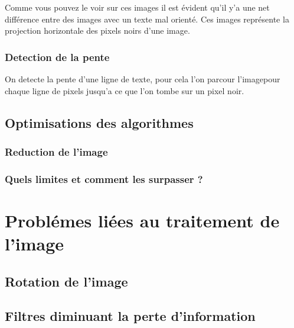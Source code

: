  Comme vous pouvez le voir sur ces images il est \'evident qu'il y'a une
 net diff\'erence entre des images avec un texte mal orient\'e. Ces
 images repr\'esente la projection horizontale des pixels noirs d'une image.





\subsection{ Detection de la pente }
On detecte la pente d'une ligne de texte, pour cela l'on parcour l'imagepour
chaque ligne de pixels jusqu'a ce que l'on tombe sur un pixel noir.

\section{ Optimisations des algorithmes }
\subsection{ Reduction de l'image }


\subsection{ Quels limites et comment les surpasser ? }


\chapter{ Probl\'emes li\'ees au traitement de l'image }
\section{ Rotation de l'image}
\section{ Filtres diminuant la perte d'information}







